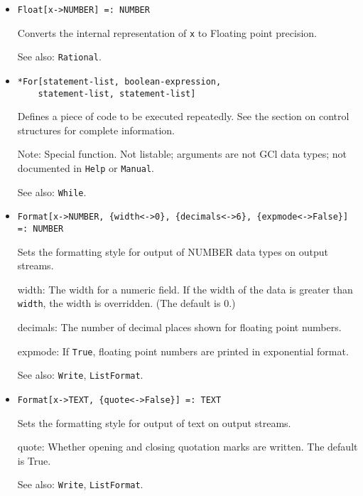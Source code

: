 \begin{itemize}
\item{}
\protect \large \begin{verbatim}
Float[x->NUMBER] =: NUMBER
\end{verbatim} \normalsize

\bd Converts the internal representation of \verb+x+ to Floating point
precision.
\item [See also:] \verb+Rational+.
\ed

\item{}
\protect \large \begin{verbatim}
*For[statement-list, boolean-expression, 
    statement-list, statement-list]
\end{verbatim}\normalsize

\bd
Defines a piece of code to be executed repeatedly.  See the section
on control structures for complete information.
\item [Note:] Special function.  Not listable; arguments are not GCl
data types; not documented in \verb+Help+ or \verb+Manual+.  
\item
[See also:] \verb+While+.
\ed

\item{}
\protect \large \begin{verbatim}
Format[x->NUMBER, {width<->0}, {decimals<->6}, {expmode<->False}] =: NUMBER 
\end{verbatim} \normalsize

\bd
Sets the formatting style for output of NUMBER data types on output streams.
\bd
\item [width:] The width for a numeric field.  If the width of the
data is greater than \verb+width+, the width is overridden.  (The
default is 0.)
\item [decimals:] The number of decimal places shown for floating point
numbers.
\item [expmode:] If \verb+True+, floating point numbers are printed in
exponential format.
\ed
\item [See also:] \verb+Write+, \verb+ListFormat+.
\ed

\item{}
\protect \large \begin{verbatim}
Format[x->TEXT, {quote<->False}] =: TEXT 
\end{verbatim} \normalsize

\bd
Sets the formatting style for output of text on output streams.
\bd
\item [quote:] Whether opening and closing quotation marks are
written.  The default is True.  
\ed
\item [See also:] \verb+Write+, \verb+ListFormat+.
\ed



\end{itemize}
